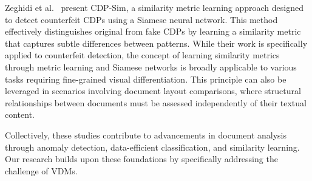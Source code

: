 Zeghidi et al.~\cite{zeghidi2023cdpsim} present CDP-Sim, a similarity metric learning approach designed to detect counterfeit \glspl{CDP} using a Siamese neural network. This method effectively distinguishes original from fake \glspl{CDP} by learning a similarity metric that captures subtle differences between patterns. While their work is specifically applied to counterfeit detection, the concept of learning similarity metrics through metric learning and Siamese networks is broadly applicable to various tasks requiring fine-grained visual differentiation. This principle can also be leveraged in scenarios involving document layout comparisons, where structural relationships between documents must be assessed independently of their textual content.

Collectively, these studies contribute to advancements in document analysis through anomaly detection, data-efficient classification, and similarity learning. Our research builds upon these foundations by specifically addressing the challenge of \glspl{VDM}.